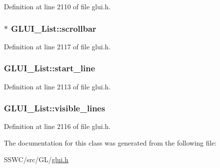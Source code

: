 Definition at line 2110 of file glui.\+h.

\hypertarget{class_g_l_u_i___list_ac8fe09ec0191ac3ac6c71b1e6ddb8751}{
\subsubsection[{scrollbar}]{$\ast$ G\+L\+U\+I\+\_\+\+List\+::scrollbar}}\label{class_g_l_u_i___list_ac8fe09ec0191ac3ac6c71b1e6ddb8751}


Definition at line 2117 of file glui.\+h.

\hypertarget{class_g_l_u_i___list_a475abba021f135544370a6ac04a9c8b1}{
\subsubsection[{start\+\_\+line}]{ G\+L\+U\+I\+\_\+\+List\+::start\+\_\+line}}\label{class_g_l_u_i___list_a475abba021f135544370a6ac04a9c8b1}


Definition at line 2113 of file glui.\+h.

\hypertarget{class_g_l_u_i___list_ad400982efb9f4155bc7294f858f4de87}{
\subsubsection[{visible\+\_\+lines}]{ G\+L\+U\+I\+\_\+\+List\+::visible\+\_\+lines}}\label{class_g_l_u_i___list_ad400982efb9f4155bc7294f858f4de87}


Definition at line 2116 of file glui.\+h.



The documentation for this class was generated from the following file\+:\begin{DoxyCompactItemize}
\item 
S\+S\+W\+C/src/\+G\+L/\hyperlink{glui_8h}{glui.\+h}\end{DoxyCompactItemize}

